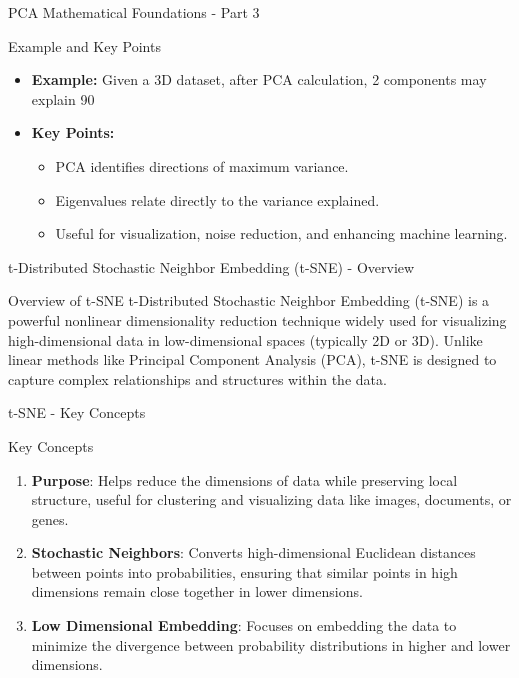 \documentclass[aspectratio=169]{beamer}
\begin{document}
\begin{frame}[fragile]{PCA Mathematical Foundations - Part 3}
  \begin{block}{Example and Key Points}
    \begin{itemize}
      \item \textbf{Example:}  
        Given a 3D dataset, after PCA calculation, 2 components may explain 90%
      
      \item \textbf{Key Points:}
        \begin{itemize}
          \item PCA identifies directions of maximum variance.
          \item Eigenvalues relate directly to the variance explained.
          \item Useful for visualization, noise reduction, and enhancing machine learning.
        \end{itemize}
    \end{itemize}
  \end{block}
\end{frame}

\begin{frame}[fragile]{t-Distributed Stochastic Neighbor Embedding (t-SNE) - Overview}
  \begin{block}{Overview of t-SNE}
    t-Distributed Stochastic Neighbor Embedding (t-SNE) is a powerful nonlinear dimensionality reduction technique widely used for visualizing high-dimensional data in low-dimensional spaces (typically 2D or 3D).
    Unlike linear methods like Principal Component Analysis (PCA), t-SNE is designed to capture complex relationships and structures within the data.
  \end{block}
\end{frame}

\begin{frame}[fragile]{t-SNE - Key Concepts}
  \begin{block}{Key Concepts}
    \begin{enumerate}
      \item \textbf{Purpose}: Helps reduce the dimensions of data while preserving local structure, useful for clustering and visualizing data like images, documents, or genes.
      \item \textbf{Stochastic Neighbors}: Converts high-dimensional Euclidean distances between points into probabilities, ensuring that similar points in high dimensions remain close together in lower dimensions.
      \item \textbf{Low Dimensional Embedding}: Focuses on embedding the data to minimize the divergence between probability distributions in higher and lower dimensions.
    \end{enumerate}
  \end{block}
\end{frame}
\end{document}
